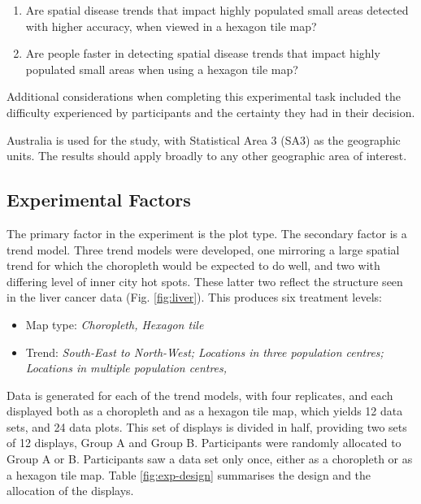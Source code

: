 \documentclass[12pt]{article}
\providecommand{\tightlist}{%
  \setlength{\itemsep}{0pt}\setlength{\parskip}{0pt}}
\begin{document}
\begin{enumerate}
\def\labelenumi{\arabic{enumi}.}
\tightlist
\item
  Are spatial disease trends that impact highly populated small areas
  detected with higher accuracy, when viewed in a hexagon tile map?
\item
  Are people faster in detecting spatial disease trends that impact
  highly populated small areas when using a hexagon tile map?
\end{enumerate}

Additional considerations when completing this experimental task
included the difficulty experienced by participants and the certainty
they had in their decision.

Australia is used for the study, with Statistical Area 3 (SA3)
\citep{abs2016} as the geographic units. The results should apply
broadly to any other geographic area of interest.

\subsection{Experimental Factors}
\label{sec:ef}

The primary factor in the experiment is the plot type. The secondary
factor is a trend model. Three trend models were developed, one
mirroring a large spatial trend for which the choropleth would be
expected to do well, and two with differing level of inner city hot
spots. These latter two reflect the structure seen in the liver cancer
data (Fig. \ref{fig:liver}). This produces six treatment levels:

\begin{itemize}
\tightlist
\item
  Map type: \emph{Choropleth, Hexagon tile}
\item
  Trend: \emph{South-East to North-West; Locations in three population
  centres; Locations in multiple population centres, }
\end{itemize}

Data is generated for each of the trend models, with four replicates,
and each displayed both as a choropleth and as a hexagon tile map, which
yields 12 data sets, and 24 data plots. This set of displays is divided
in half, providing two sets of 12 displays, Group A and Group B.
Participants were randomly allocated to Group A or B. Participants saw a
data set only once, either as a choropleth or as a hexagon tile map.
Table \ref{fig:exp-design} summarises the design and the allocation of
the displays.
\end{document}
